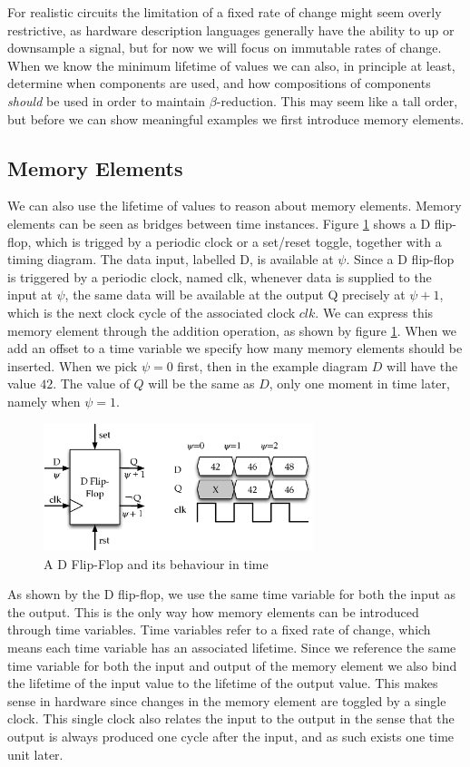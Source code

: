 For realistic circuits the limitation of a fixed rate of change might seem overly restrictive, as hardware description languages generally have the ability to up or downsample a signal, but for now we will focus on immutable rates of change.
When we know the minimum lifetime of values we can also, in principle at least, determine when components are used, and how compositions of components \textit{should} be used in order to maintain $\beta$-reduction.
This may seem like a tall order, but before we can show meaningful examples we first introduce memory elements.

\subsection{Memory Elements}
We can also use the lifetime of values to reason about memory elements.
Memory elements can be seen as bridges between time instances.
Figure \ref{fig:dff} shows a D flip-flop, which is trigged by a periodic clock or a set/reset toggle, together with a timing diagram.
The data input, labelled D, is available at $\psi$.
Since a D flip-flop is triggered by a periodic clock, named clk, whenever data is supplied to the input at $\psi$, the same data will be available at the output Q precisely at $\psi+1$, which is the next clock cycle of the associated clock $clk$.
We can express this memory element through the addition operation, as shown by figure \ref{fig:dff}.
When we add an offset to a time variable we specify how many memory elements should be inserted.
When we pick $\psi = 0$ first, then in the example diagram $D$ will have the value $42$. 
The value of $Q$ will be the same as $D$, only one moment in time later, namely when $\psi=1$.

\begin{figure}[h]
\centering
\includegraphics[width=0.7\textwidth]{images/dff}
\caption{A D Flip-Flop and its behaviour in time} \label{fig:dff}
\end{figure}

As shown by the D flip-flop, we use the same time variable for both the input as the output.
This is the only way how memory elements can be introduced through time variables.
Time variables refer to a fixed rate of change, which means each time variable has an associated lifetime.
Since we reference the same time variable for both the input and output of the memory element we also bind the lifetime of the input value to the lifetime of the output value. 
This makes sense in hardware since changes in the memory element are toggled by a single clock.
This single clock also relates the input to the output in the sense that the output is always produced one cycle after the input, and as such exists one time unit later.

